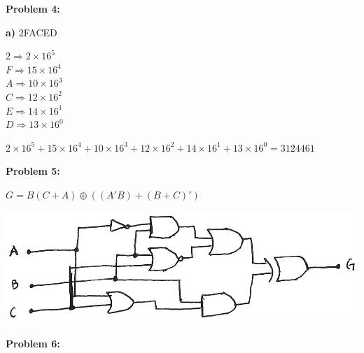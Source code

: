 \documentclass{article}
\begin{document}
    \quad\quad {}

    \textbf{Problem 4:}

    \quad \textbf{a)} 2FACED

    \begin{center}
        $2 \Rightarrow  2 \times 16^5$ \\
        $F \Rightarrow 15 \times 16^4$ \\
        $A \Rightarrow 10 \times 16^3$ \\
        $C \Rightarrow 12 \times 16^2$ \\
        $E \Rightarrow 14 \times 16^1$ \\
        $D \Rightarrow 13 \times 16^0$ \\
    \end{center}

    \quad\quad $2 \times 16^5 + 
        15 \times 16^4 + 
        10 \times 16^3 +
        12 \times 16^2 + 
        14 \times 16^1 + 
        13 \times 16^0 = \boxed{3124461}$

    \textbf{Problem 5:}
    
    $G = B(C+A) \oplus ((A'B) + (B+C)')$
    \begin{center}
        \includegraphics{001.png}
    \end{center}

    \quad\quad
    \noindent{}




    \textbf{Problem 6:}
\end{document}
